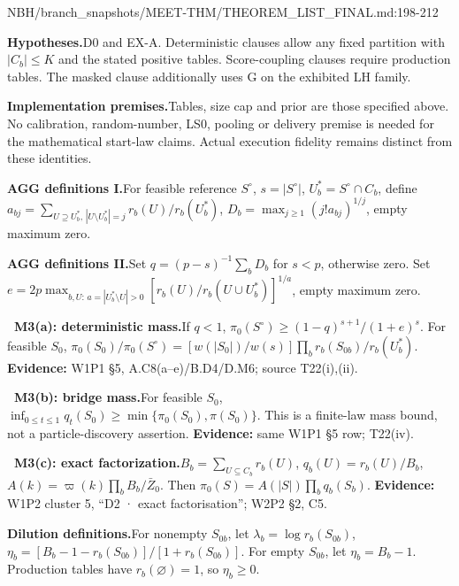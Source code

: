 \begin{stmt}{NBH/branch_snapshots/MEET-THM/THEOREM_LIST_FINAL.md:198-212}
\par\smallskip\noindent\textbf{Hypotheses.}\enspace D0 and EX-A. Deterministic clauses allow any fixed partition with \(|C_b|\le K\) and the stated positive tables. Score-coupling clauses require production tables. The masked clause additionally uses G on the exhibited LH family.
\par\smallskip\noindent\textbf{Implementation premises.}\enspace Tables, size cap and prior are those specified above. No calibration, random-number, LS0, pooling or delivery premise is needed for the mathematical start-law claims. Actual execution fidelity remains distinct from these identities.
\par\smallskip\noindent\textbf{AGG definitions I.}\enspace For feasible reference \(S^\circ\), \(s=|S^\circ|\), \(U_b^*=S^\circ\cap C_b\), define \(a_{bj}=\sum_{U\supseteq U_b^*,\,|U\setminus U_b^*|=j}r_b(U)/r_b(U_b^*)\), \(D_b=\max_{j\ge1}(j!a_{bj})^{1/j}\), empty maximum zero.
\par\smallskip\noindent\textbf{AGG definitions II.}\enspace Set \(q=(p-s)^{-1}\sum_bD_b\) for \(s<p\), otherwise zero. Set \(e=2p\max_{b,U:\,a=|U_b^*\setminus U|>0}[r_b(U)/r_b(U\cup U_b^*)]^{1/a}\), empty maximum zero.
\par\smallskip\noindent\textbf{\ M3(a): deterministic mass.}\enspace If \(q<1\), \(\pi_0(S^\circ)\ge(1-q)^{s+1}/(1+e)^s\). For feasible \(S_0\), \(\pi_0(S_0)/\pi_0(S^\circ)=[w(|S_0|)/w(s)]\prod_b r_b(S_{0b})/r_b(U_b^*)\). \textbf{Evidence:} W1P1 §5, A.C8(a–e)/B.D4/D.M6; source T22(i),(ii).
\par\smallskip\noindent\textbf{\ M3(b): bridge mass.}\enspace For feasible \(S_0\), \(\inf_{0\le t\le1}q_t(S_0)\ge\min\{\pi_0(S_0),\pi(S_0)\}\). This is a finite-law mass bound, not a particle-discovery assertion. \textbf{Evidence:} same W1P1 §5 row; T22(iv).
\par\smallskip\noindent\textbf{\ M3(c): exact factorization.}\enspace \(B_b=\sum_{U\subseteq C_b}r_b(U)\), \(q_b(U)=r_b(U)/B_b\), \(A(k)=\varpi(k)\prod_bB_b/\bar Z_0\). Then \(\pi_0(S)=A(|S|)\prod_bq_b(S_b)\). \textbf{Evidence:} W1P2 cluster 5, “D2 · exact factorisation”; W2P2 §2, C5.
\par\smallskip\noindent\textbf{Dilution definitions.}\enspace For nonempty \(S_{0b}\), let \(\lambda_b=\log r_b(S_{0b})\), \(\eta_b=[B_b-1-r_b(S_{0b})]/[1+r_b(S_{0b})]\). For empty \(S_{0b}\), let \(\eta_b=B_b-1\). Production tables have \(r_b(\varnothing)=1\), so \(\eta_b\ge0\).

\end{stmt}
